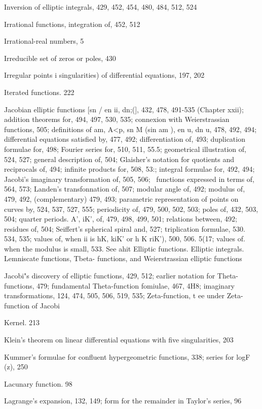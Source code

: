 Inversion of elliptic integrals, 429, 452, 454, 480, 484, 512, 524

Irrational functions, integration of, 452, 512

Irrational-real numbers, 5

%
%

Irreducible set of zeros or poles, 430

Irregular points i singularities) of differential equations, 197, 202

Iterated functions. 222

Jacobian elliptic functions [sn /  en ii, dn;(], 432, 478, 491-535 (Chapter xxii); addition theorems
for, 494, 497, 530, 535; connexion with Weierstrassian functions, 505; definitions of am,
A<p, sn M (sin am  ), en u, dn u, 478, 492, 494; differential equations satisfied by, 477, 492;
differentiation of, 493; duplication formulae for, 498; Fourier series for, 510, 511, 55.5;
geometrical illustration of, 524, 527; general description of, 504; Glaisher's notation for
quotients and reciprocals of, 494; infinite products for, 508, 53:; integral formulae for, 492,
494; Jacobi's imaginary transformation of, 505, 506; \Lame\ functions expressed in terms of,
564, 573; Landen's transfonnation of, 507; modular angle of, 492; modulus of, 479, 492,
(complementary) 479, 493; parametric representation of points on curves by, 524, 537, 527,
555; periodicity of, 479, 500, 502, 503; poles of, 432, 503, 504; quarter periods. A', iK', of,
479, 498, 499, 501; relations between, 492; residues of, 504; Seiffert's spherical spiral and,
527; triplication formulae, 530. 534, 535; values of, when ii is hK, kiK' or h  K riK'), 500,
506. 5(17; values of. when the modulus is small, 533. See ahit Elliptic functions. Elliptic
integrals. Lemniscate functions, Tbeta- functions, and Weierstrassian elliptic functions

Jacobi"s discovery of elliptic functions, 429, 512; earlier notation for Theta-functions, 479;
fundamental Theta-function fomiulae, 467, 4H8; imaginary transformations, 124, 474, 505,
506, 519, 535; Zeta-function, t ee under Zeta-function of Jacobi

Kernel. 213

Klein's theorem on linear differential equations with five singularities, 203

Kummer's formulae for confluent hypergeometric functions, 338; series for logF (z), 250

Lacunary function. 98

Lagrange's expansion, 132, 149; form for the remainder in Taylor's series, 96


